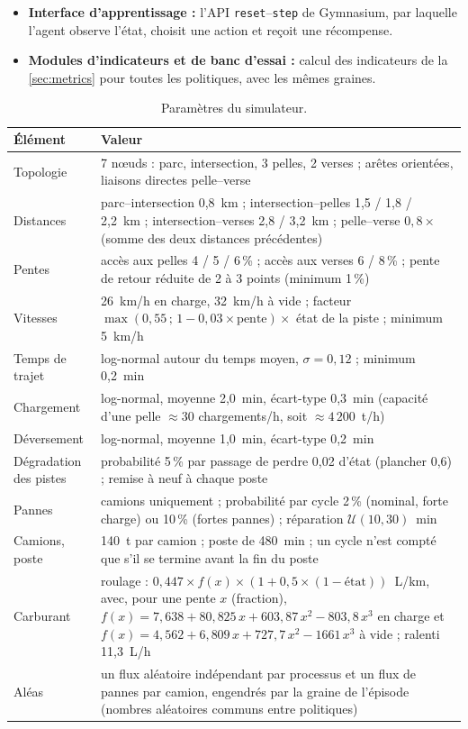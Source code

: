 \documentclass[11pt,a4paper]{article}
\newif\ifrevmarks
\newcommand{\revtag}[1]{\ifrevmarks\textsuperscript{\textcolor{red!70!black}{\scriptsize[#1]}}\fi}
\newcommand{\rev}[2]{\ifrevmarks{\color{revcolor}#2}\revtag{#1}\else#2\fi}
\newenvironment{revbloc}[1]{\par\ifrevmarks\color{revcolor}\noindent\revtag{#1}\ \fi}{\par}
\begin{document}
\begin{revbloc}{M11, A, v3}
\begin{itemize}
  \item \textbf{Interface d'apprentissage :} l'API \texttt{reset}--\texttt{step} de Gymnasium, par laquelle l'agent observe l'état, choisit une action et reçoit une récompense.
  \item \textbf{Modules d'indicateurs et de banc d'essai :} calcul des indicateurs de la \cref{sec:metrics} pour toutes les politiques, avec les mêmes graines.
\end{itemize}
\end{revbloc}

\begin{table}[H]
\centering
\caption{\rev{M11}{Paramètres du simulateur.}}
\label{tab:simparams}
\footnotesize
\begin{tabularx}{\textwidth}{>{\raggedright\arraybackslash}p{3.6cm}X}
\toprule
\textbf{Élément} & \textbf{Valeur} \\
\midrule
Topologie & 7 nœuds : parc, intersection, 3 pelles, 2 verses ; arêtes orientées, liaisons directes pelle--verse \\
Distances & parc--intersection 0,8~km ; intersection--pelles 1,5 / 1,8 / 2,2~km ; intersection--verses 2,8 / 3,2~km ; pelle--verse $0{,}8\times$ (somme des deux distances précédentes) \\
Pentes & accès aux pelles 4 / 5 / 6\,\% ; accès aux verses 6 / 8\,\% ; pente de retour réduite de 2 à 3 points (minimum 1\,\%) \\
Vitesses & 26~km/h en charge, 32~km/h à vide ; facteur $\max(0{,}55\,;\,1-0{,}03\times\text{pente})\times$ état de la piste ; minimum 5~km/h \\
Temps de trajet & log-normal autour du temps moyen, $\sigma=0{,}12$ ; minimum 0,2~min \\
Chargement & log-normal, moyenne 2,0~min, écart-type 0,3~min (capacité d'une pelle $\approx 30$ chargements/h, soit $\approx 4\,200$~t/h) \\
Déversement & log-normal, moyenne 1,0~min, écart-type 0,2~min \\
Dégradation des pistes & probabilité 5\,\% par passage de perdre 0,02 d'état (plancher 0,6) ; remise à neuf à chaque poste \\
Pannes & camions uniquement ; probabilité par cycle 2\,\% (nominal, forte charge) ou 10\,\% (fortes pannes) ; réparation $\mathcal{U}(10,30)$~min \\
Camions, poste & 140~t par camion ; poste de 480~min ; un cycle n'est compté que s'il se termine avant la fin du poste \\
Carburant & \rev{v3}{roulage : $0{,}447 \times f(x) \times (1+0{,}5\times(1-\text{état}))$~L/km, avec, pour une pente $x$ (fraction), $f(x) = 7{,}638 + 80{,}825\,x + 603{,}87\,x^2 - 803{,}8\,x^3$ en charge et $f(x) = 4{,}562 + 6{,}809\,x + 727{,}7\,x^2 - 1661\,x^3$ à vide \cite{Kubler2015} ; ralenti 11,3~L/h \cite{Kubler2015}} \\
Aléas & \rev{v3}{un flux aléatoire indépendant par processus et un flux de pannes par camion, engendrés par la graine de l'épisode (nombres aléatoires communs entre politiques)} \\
\bottomrule
\end{tabularx}
\end{table}
\end{document}
